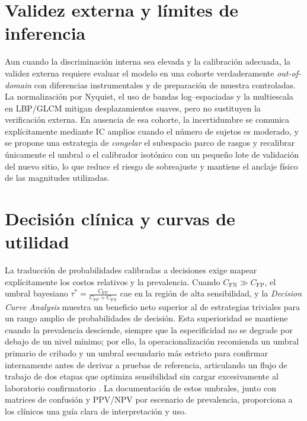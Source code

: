 \section*{Validez externa y límites de inferencia}
Aun cuando la discriminación interna sea elevada y la calibración adecuada, la validez externa requiere evaluar el modelo en una cohorte verdaderamente \emph{out-of-domain} con diferencias instrumentales y de preparación de muestra controladas. La normalización por Nyquist, el uso de bandas log–espaciadas y la multiescala en LBP/GLCM mitigan desplazamientos suaves, pero no sustituyen la verificación externa. En ausencia de esa cohorte, la incertidumbre se comunica explícitamente mediante IC amplios cuando el número de sujetos es moderado, y se propone una estrategia de \emph{congelar} el subespacio parco de rasgos y recalibrar únicamente el umbral o el calibrador isotónico con un pequeño lote de validación del nuevo sitio, lo que reduce el riesgo de sobreajuste y mantiene el anclaje físico de las magnitudes utilizadas.


\section*{Decisión clínica y curvas de utilidad}
La traducción de probabilidades calibradas a decisiones exige mapear explícitamente los costos relativos y la prevalencia. Cuando $C_{\mathrm{FN}}\gg C_{\mathrm{FP}}$, el umbral bayesiano $\tau^\ast=\frac{C_{\mathrm{FP}}}{C_{\mathrm{FP}}+C_{\mathrm{FN}}}$ cae en la región de alta sensibilidad, y la \emph{Decision Curve Analysis} muestra un beneficio neto superior al de estrategias triviales para un rango amplio de probabilidades de decisión. Esta superioridad se mantiene cuando la prevalencia desciende, siempre que la especificidad no se degrade por debajo de un nivel mínimo; por ello, la operacionalización recomienda un umbral primario de cribado y un umbral secundario más estricto para confirmar internamente antes de derivar a pruebas de referencia, articulando un flujo de trabajo de dos etapas que optimiza sensibilidad sin cargar excesivamente al laboratorio confirmatorio \cite{Vickers2006MedDec}. La documentación de estos umbrales, junto con matrices de confusión y PPV/NPV por escenario de prevalencia, proporciona a los clínicos una guía clara de interpretación y uso.

